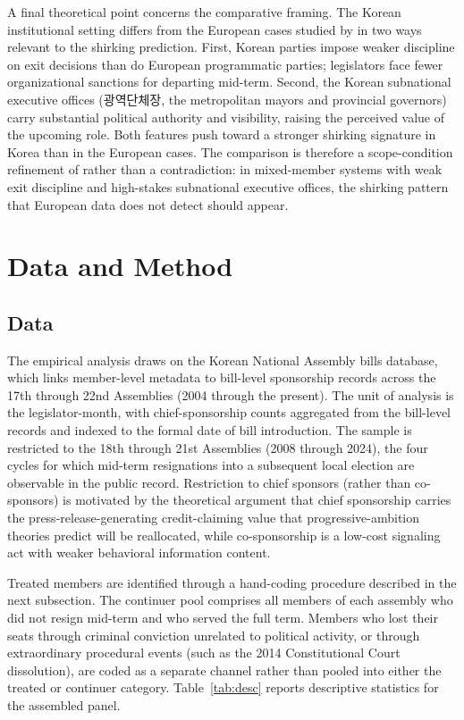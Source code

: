 \documentclass[11pt]{article}
\begin{document}
A final theoretical point concerns the comparative framing. The Korean institutional setting differs from the European cases studied by \citet{hansen2015} in two ways relevant to the shirking prediction. First, Korean parties impose weaker discipline on exit decisions than do European programmatic parties; legislators face fewer organizational sanctions for departing mid-term. Second, the Korean subnational executive offices (광역단체장, the metropolitan mayors and provincial governors) carry substantial political authority and visibility, raising the perceived value of the upcoming role. Both features push toward a stronger shirking signature in Korea than in the European cases. The comparison is therefore a scope-condition refinement of \citet{hansen2015} rather than a contradiction: in mixed-member systems with weak exit discipline and high-stakes subnational executive offices, the shirking pattern that European data does not detect should appear.

\section{Data and Method}\label{sec:data}

\subsection{Data}

The empirical analysis draws on the Korean National Assembly bills database, which links member-level metadata to bill-level sponsorship records across the 17th through 22nd Assemblies (2004 through the present). The unit of analysis is the legislator-month, with chief-sponsorship counts aggregated from the bill-level records and indexed to the formal date of bill introduction. The sample is restricted to the 18th through 21st Assemblies (2008 through 2024), the four cycles for which mid-term resignations into a subsequent local election are observable in the public record. Restriction to chief sponsors (rather than co-sponsors) is motivated by the theoretical argument that chief sponsorship carries the press-release-generating credit-claiming value that progressive-ambition theories predict will be reallocated, while co-sponsorship is a low-cost signaling act with weaker behavioral information content.

Treated members are identified through a hand-coding procedure described in the next subsection. The continuer pool comprises all members of each assembly who did not resign mid-term and who served the full term. Members who lost their seats through criminal conviction unrelated to political activity, or through extraordinary procedural events (such as the 2014 Constitutional Court dissolution), are coded as a separate channel rather than pooled into either the treated or continuer category. Table~\ref{tab:desc} reports descriptive statistics for the assembled panel.
\end{document}
